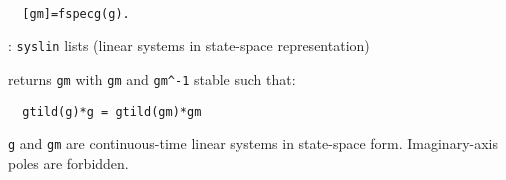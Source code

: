 \begin{mandesc}
   \\ %
\end{mandesc}
\begin{calling_sequence}
\begin{verbatim}
  [gm]=fspecg(g).  
\end{verbatim}
\end{calling_sequence}
\begin{parameters}
  \begin{varlist}
    : \verb!syslin! lists (linear systems in state-space representation)
  \end{varlist}
\end{parameters}
\begin{mandescription}
  returns \verb!gm! with \verb!gm! and \verb!gm^-1! stable such that:
\begin{verbatim}
  gtild(g)*g = gtild(gm)*gm
\end{verbatim}
  \verb!g! and \verb!gm! are continuous-time linear systems in state-space form.
  Imaginary-axis poles are forbidden.
\end{mandescription}
